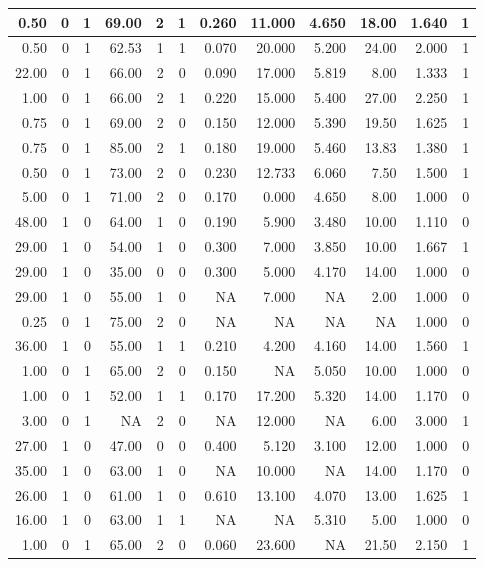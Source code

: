 \documentclass[
]{article}
\begin{document}
\begin{table}
\begin{tabular}[t]{r|r|r|r|r|r|r|r|r|r|r|r}
\hline
0.50 & 0 & 1 & 69.00 & 2 & 1 & 0.260 & 11.000 & 4.650 & 18.00 & 1.640 & 1\\
\hline
0.50 & 0 & 1 & 62.53 & 1 & 1 & 0.070 & 20.000 & 5.200 & 24.00 & 2.000 & 1\\
\hline
22.00 & 0 & 1 & 66.00 & 2 & 0 & 0.090 & 17.000 & 5.819 & 8.00 & 1.333 & 1\\
\hline
1.00 & 0 & 1 & 66.00 & 2 & 1 & 0.220 & 15.000 & 5.400 & 27.00 & 2.250 & 1\\
\hline
0.75 & 0 & 1 & 69.00 & 2 & 0 & 0.150 & 12.000 & 5.390 & 19.50 & 1.625 & 1\\
\hline
0.75 & 0 & 1 & 85.00 & 2 & 1 & 0.180 & 19.000 & 5.460 & 13.83 & 1.380 & 1\\
\hline
0.50 & 0 & 1 & 73.00 & 2 & 0 & 0.230 & 12.733 & 6.060 & 7.50 & 1.500 & 1\\
\hline
5.00 & 0 & 1 & 71.00 & 2 & 0 & 0.170 & 0.000 & 4.650 & 8.00 & 1.000 & 0\\
\hline
48.00 & 1 & 0 & 64.00 & 1 & 0 & 0.190 & 5.900 & 3.480 & 10.00 & 1.110 & 0\\
\hline
29.00 & 1 & 0 & 54.00 & 1 & 0 & 0.300 & 7.000 & 3.850 & 10.00 & 1.667 & 1\\
\hline
29.00 & 1 & 0 & 35.00 & 0 & 0 & 0.300 & 5.000 & 4.170 & 14.00 & 1.000 & 0\\
\hline
29.00 & 1 & 0 & 55.00 & 1 & 0 & NA & 7.000 & NA & 2.00 & 1.000 & 0\\
\hline
0.25 & 0 & 1 & 75.00 & 2 & 0 & NA & NA & NA & NA & 1.000 & 0\\
\hline
36.00 & 1 & 0 & 55.00 & 1 & 1 & 0.210 & 4.200 & 4.160 & 14.00 & 1.560 & 1\\
\hline
1.00 & 0 & 1 & 65.00 & 2 & 0 & 0.150 & NA & 5.050 & 10.00 & 1.000 & 0\\
\hline
1.00 & 0 & 1 & 52.00 & 1 & 1 & 0.170 & 17.200 & 5.320 & 14.00 & 1.170 & 0\\
\hline
3.00 & 0 & 1 & NA & 2 & 0 & NA & 12.000 & NA & 6.00 & 3.000 & 1\\
\hline
27.00 & 1 & 0 & 47.00 & 0 & 0 & 0.400 & 5.120 & 3.100 & 12.00 & 1.000 & 0\\
\hline
35.00 & 1 & 0 & 63.00 & 1 & 0 & NA & 10.000 & NA & 14.00 & 1.170 & 0\\
\hline
26.00 & 1 & 0 & 61.00 & 1 & 0 & 0.610 & 13.100 & 4.070 & 13.00 & 1.625 & 1\\
\hline
16.00 & 1 & 0 & 63.00 & 1 & 1 & NA & NA & 5.310 & 5.00 & 1.000 & 0\\
\hline
1.00 & 0 & 1 & 65.00 & 2 & 0 & 0.060 & 23.600 & NA & 21.50 & 2.150 & 1\\

\end{tabular}
\end{table}
\end{document}

